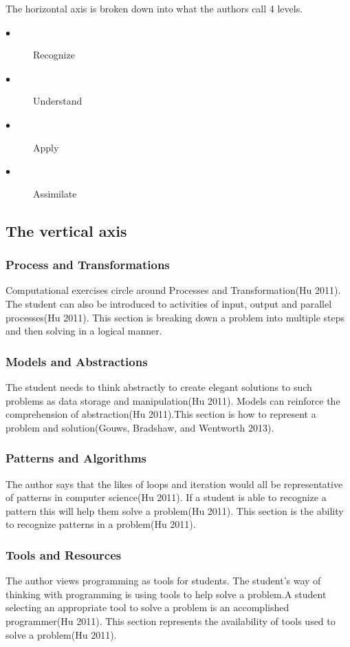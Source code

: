 The horizontal axis is broken down into what the authors call 4 levels.

\begin{description}
	\item[$\bullet$] Recognize
	\item[$\bullet$] Understand
	\item[$\bullet$] Apply
	\item[$\bullet$] Assimilate	
\end{description}

\subsection{The vertical axis}

\subsubsection{Process and Transformations}
Computational exercises circle around Processes and Transformation(Hu 2011). The student can also be introduced to activities of input, output and parallel processes(Hu 2011). This section is breaking down a problem into multiple steps and then solving in a logical manner.

\subsubsection{Models and Abstractions}
The student needs to think abstractly to create elegant solutions to such problems as data storage and manipulation(Hu 2011). Models can reinforce the comprehension of abstraction(Hu 2011).This section is how to represent a problem and solution(Gouws, Bradshaw, and Wentworth 2013).

\subsubsection{Patterns and Algorithms}
The author says that the likes of loops and iteration would all be representative of patterns in computer science(Hu 2011). If a student is able to recognize a pattern this will help them solve a problem(Hu 2011). This section is the ability to recognize patterns in a problem(Hu 2011).

\subsubsection{Tools and Resources}
The author views programming as tools for students. The student's way of thinking with programming is using tools to help solve a problem.A student selecting an appropriate tool to solve a problem is an accomplished programmer(Hu 2011). This section represents the availability of tools used to solve a problem(Hu 2011).

